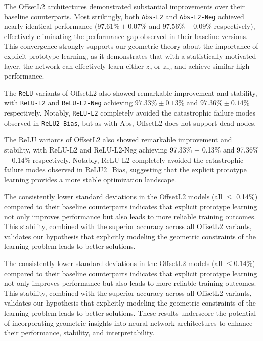 The OffsetL2 architectures demonstrated substantial improvements over their baseline counterparts. Most strikingly, both \texttt{Abs-L2} and \texttt{Abs-L2-Neg} achieved nearly identical performance ($97.61\% \pm 0.07\%$ and $97.56\% \pm 0.09\%$ respectively), effectively eliminating the performance gap observed in their baseline versions. This convergence strongly supports our geometric theory about the importance of explicit prototype learning, as it demonstrates that with a statistically motivated layer, the network can effectively learn either $z_c$ or $z_{\neg c}$ and achieve similar high performance.

The \texttt{ReLU} variants of OffsetL2 also showed remarkable improvement and stability, with \texttt{ReLU-L2} and \texttt{ReLU-L2-Neg} achieving $97.33\% \pm 0.13\%$ and $97.36\% \pm 0.14\%$ respectively. Notably, \texttt{ReLU-L2} completely avoided the catastrophic failure modes observed in \texttt{ReLU2\_Bias}, but as with Abs, OffsetL2 does not support dead nodes.

The ReLU variants of OffsetL2 also showed remarkable improvement and stability, with ReLU-L2 and ReLU-L2-Neg achieving 97.33\% $\pm$ 0.13\% and 97.36\% $\pm$ 0.14\% respectively. Notably, ReLU-L2 completely avoided the catastrophic failure modes observed in ReLU2\_Bias, suggesting that the explicit prototype learning provides a more stable optimization landscape.

The consistently lower standard deviations in the OffsetL2 models (all $\leq$ 0.14\%) compared to their baseline counterparts indicates that explicit prototype learning not only improves performance but also leads to more reliable training outcomes. This stability, combined with the superior accuracy across all OffsetL2 variants, validates our hypothesis that explicitly modeling the geometric constraints of the learning problem leads to better solutions.

The consistently lower standard deviations in the OffsetL2 models (all $\leq 0.14\%$) compared to their baseline counterparts indicates that explicit prototype learning not only improves performance but also leads to more reliable training outcomes. This stability, combined with the superior accuracy across all OffsetL2 variants, validates our hypothesis that explicitly modeling the geometric constraints of the learning problem leads to better solutions.  These results underscore the potential of incorporating geometric insights into neural network architectures to enhance their performance, stability, and interpretability.


